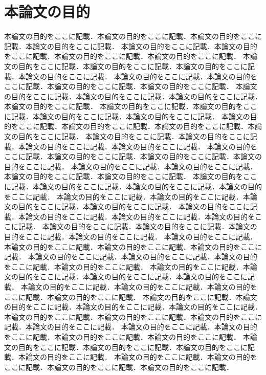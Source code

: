\section{本論文の目的}
本論文の目的をここに記載．本論文の目的をここに記載．本論文の目的をここに記載．本論文の目的をここに記載．
本論文の目的をここに記載．本論文の目的をここに記載．本論文の目的をここに記載．本論文の目的をここに記載．
本論文の目的をここに記載．本論文の目的をここに記載．本論文の目的をここに記載．本論文の目的をここに記載．
本論文の目的をここに記載．本論文の目的をここに記載．本論文の目的をここに記載．本論文の目的をここに記載．
本論文の目的をここに記載．本論文の目的をここに記載．本論文の目的をここに記載．本論文の目的をここに記載．
本論文の目的をここに記載．本論文の目的をここに記載．本論文の目的をここに記載．本論文の目的をここに記載．
本論文の目的をここに記載．本論文の目的をここに記載．本論文の目的をここに記載．本論文の目的をここに記載．
本論文の目的をここに記載．本論文の目的をここに記載．本論文の目的をここに記載．本論文の目的をここに記載．
本論文の目的をここに記載．本論文の目的をここに記載．本論文の目的をここに記載．本論文の目的をここに記載．
本論文の目的をここに記載．本論文の目的をここに記載．本論文の目的をここに記載．本論文の目的をここに記載．
本論文の目的をここに記載．本論文の目的をここに記載．本論文の目的をここに記載．本論文の目的をここに記載．
本論文の目的をここに記載．本論文の目的をここに記載．本論文の目的をここに記載．本論文の目的をここに記載．
本論文の目的をここに記載．本論文の目的をここに記載．本論文の目的をここに記載．本論文の目的をここに記載．
本論文の目的をここに記載．本論文の目的をここに記載．本論文の目的をここに記載．本論文の目的をここに記載．
本論文の目的をここに記載．本論文の目的をここに記載．本論文の目的をここに記載．本論文の目的をここに記載．
本論文の目的をここに記載．本論文の目的をここに記載．本論文の目的をここに記載．本論文の目的をここに記載．
本論文の目的をここに記載．本論文の目的をここに記載．本論文の目的をここに記載．本論文の目的をここに記載．
本論文の目的をここに記載．本論文の目的をここに記載．本論文の目的をここに記載．本論文の目的をここに記載．
本論文の目的をここに記載．本論文の目的をここに記載．本論文の目的をここに記載．本論文の目的をここに記載．
本論文の目的をここに記載．本論文の目的をここに記載．本論文の目的をここに記載．本論文の目的をここに記載．
本論文の目的をここに記載．本論文の目的をここに記載．本論文の目的をここに記載．本論文の目的をここに記載．
本論文の目的をここに記載．本論文の目的をここに記載．本論文の目的をここに記載．本論文の目的をここに記載．
本論文の目的をここに記載．本論文の目的をここに記載．本論文の目的をここに記載．本論文の目的をここに記載．
